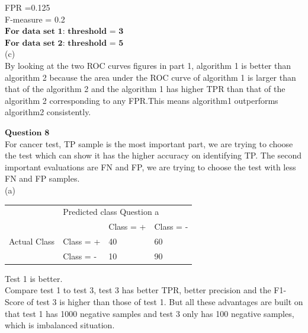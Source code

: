 \documentclass[12pt]{article}
\begin{document}
FPR =0.125\\

F-measure = 0.2\\

$\textbf{For data set 1: threshold = 3}$ \\

$\textbf{For data set 2: threshold = 5}$ \\

(c)\\

By looking at the two ROC curves figures in part 1, algorithm 1 is better than algorithm 2 because the area under the ROC curve of algorithm 1 is larger than that of the algorithm 2 and the algorithm 1 has higher TPR than that of the algorithm 2 corresponding to any FPR.This means algorithm1 outperforms algorithm2 consistently.\\

\newpage

$\textbf{Question 8}$ \\

For cancer test, TP sample is the most important part, we are trying to choose the test which can show it has the higher accuracy on identifying TP. The second important evaluations are FN and FP, we are trying to choose the test with less FN and FP samples. \\

(a)\\

\begin{table}[]
\begin{tabular}{llll}
                              & \multicolumn{3}{l}{Predicted class  Question a}     \\
\multirow{3}{*}{Actual Class} &            & Class = +    & Class = - \\
                              & Class = + & 40         & 60  \\
                              & Class = - & 10 & 90 

\end{tabular}

\end{table}

Test 1 is better.\\

Compare test 1 to test 3, test 3 has better TPR, better precision and the F1-Score of test 3 is higher than those of test 1. But all these advantages are built on that test 1 has 1000 negative samples and test 3 only has 100 negative samples, which is imbalanced situation.\\
\end{document}
